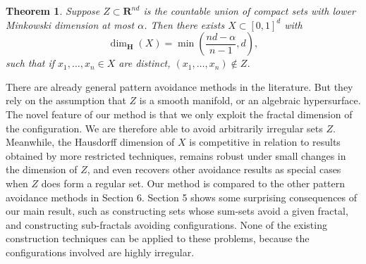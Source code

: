 \documentclass[usenames,dvipsnames]{article}
\theoremstyle{plain}
\theoremstyle{plain}
\newtheorem{theorem}{Theorem}
\begin{document}

%
%



\begin{theorem}
	Suppose $Z \subset \mathbf{R}^{nd}$ is the countable union of compact sets with lower Minkowski dimension at most $\alpha$. Then there exists $X \subset [0,1]^d$ with
	\[ \dim_{\mathbf{H}}(X) = \min \left( \frac{nd - \alpha}{n-1}, d \right), \]
	such that if $x_1, \dots, x_n \in X$ are distinct, $(x_1, \dots, x_n) \not \in Z$.
\end{theorem}

There are already general pattern avoidance methods in the literature. But they rely on the assumption that $Z$ is a smooth manifold, or an algebraic hypersurface. The novel feature of our method is that we only exploit the fractal dimension of the configuration. We are therefore able to avoid arbitrarily irregular sets $Z$. Meanwhile, the Hausdorff dimension of $X$ is competitive in relation to results obtained by more restricted techniques, remains robust under small changes in the dimension of $Z$, and even recovers other avoidance results as special cases when $Z$ does form a regular set. Our method is compared to the other pattern avoidance methods in Section 6. Section 5 shows some surprising consequences of our main result, such as constructing sets whose sum-sets avoid a given fractal, and constructing sub-fractals avoiding configurations. None of the existing construction techniques can be applied to these problems, because the configurations involved are highly irregular.
\end{document}
